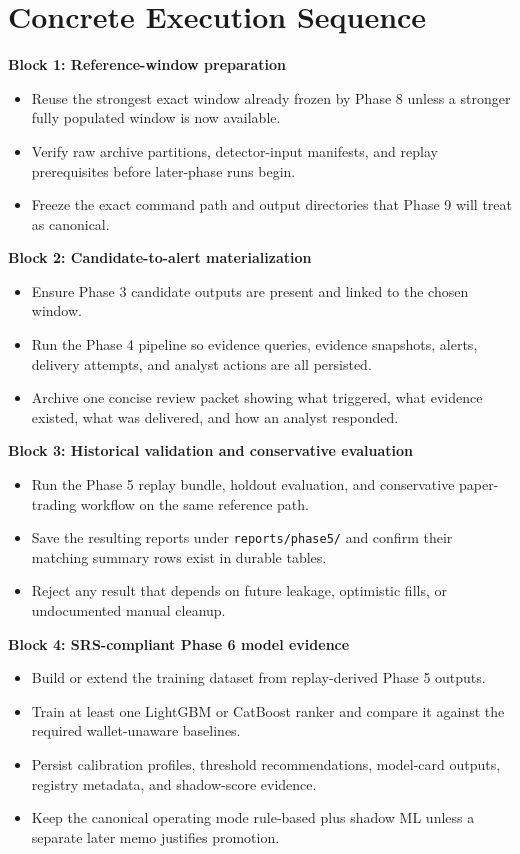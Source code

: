 \documentclass{article}
\begin{document}
\section*{Concrete Execution Sequence}
\textbf{Block 1: Reference-window preparation}
\begin{itemize}
\item Reuse the strongest exact window already frozen by Phase 8 unless a stronger fully populated window is now available.
\item Verify raw archive partitions, detector-input manifests, and replay prerequisites before later-phase runs begin.
\item Freeze the exact command path and output directories that Phase 9 will treat as canonical.
\end{itemize}

\textbf{Block 2: Candidate-to-alert materialization}
\begin{itemize}
\item Ensure Phase 3 candidate outputs are present and linked to the chosen window.
\item Run the Phase 4 pipeline so evidence queries, evidence snapshots, alerts, delivery attempts, and analyst actions are all persisted.
\item Archive one concise review packet showing what triggered, what evidence existed, what was delivered, and how an analyst responded.
\end{itemize}

\textbf{Block 3: Historical validation and conservative evaluation}
\begin{itemize}
\item Run the Phase 5 replay bundle, holdout evaluation, and conservative paper-trading workflow on the same reference path.
\item Save the resulting reports under \texttt{reports/phase5/} and confirm their matching summary rows exist in durable tables.
\item Reject any result that depends on future leakage, optimistic fills, or undocumented manual cleanup.
\end{itemize}

\textbf{Block 4: SRS-compliant Phase 6 model evidence}
\begin{itemize}
\item Build or extend the training dataset from replay-derived Phase 5 outputs.
\item Train at least one LightGBM or CatBoost ranker and compare it against the required wallet-unaware baselines.
\item Persist calibration profiles, threshold recommendations, model-card outputs, registry metadata, and shadow-score evidence.
\item Keep the canonical operating mode rule-based plus shadow ML unless a separate later memo justifies promotion.
\end{itemize}
\end{document}

